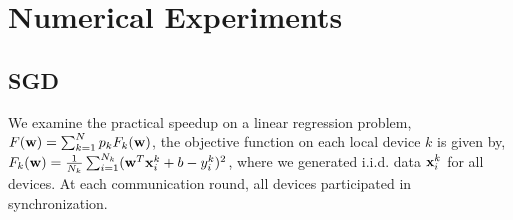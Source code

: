 


\section{Numerical Experiments}



\subsection{SGD}
We examine the practical speedup on a linear regression problem, 
$ F({\mathbf{w}}) = \sum_{k=1}^N p_kF_k({\mathbf{w}})$, the objective function on each local device $k$ is given by, $F_k({\mathbf{w}}) = \frac{1}{N_k} \sum_{i=1}^{N_k} ({\mathbf{w}}^T{\mathbf{x}}_i^k + b  - y_i^k)^2$, where we generated i.i.d. data ${\mathbf{x}}_i^k$ for all devices. At each communication round, all devices participated
in synchronization. 

